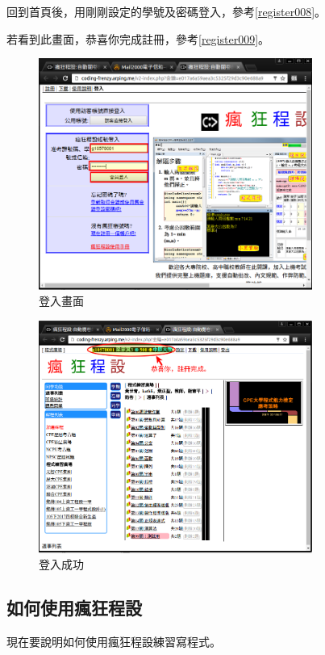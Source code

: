 回到首頁後，用剛剛設定的學號及密碼登入，參考\autoref{register008}。

若看到此畫面，恭喜你完成註冊，參考\autoref{register009}。

\begin{figure}[H]
	\centering
	\includegraphics[width=0.8\textwidth]{fig/install_and_setting/register_008}
	\caption{登入畫面}
	\label{register008}
\end{figure}



\begin{figure}[H]
	\centering
	\includegraphics[width=0.8\textwidth]{fig/install_and_setting/register_009}
	\caption{登入成功}
	\label{register009}
\end{figure}

\subsection{如何使用瘋狂程設}
現在要說明如何使用瘋狂程設練習寫程式。

